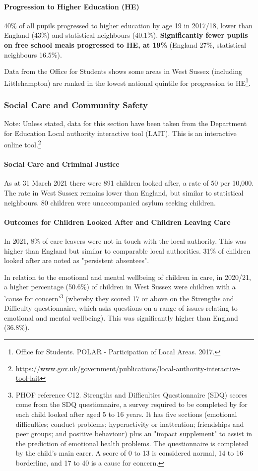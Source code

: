 \paragraph{Progression to Higher Education (HE)} 40\% of all pupils progressed to higher education by age 19 in 2017/18, lower than England (43\%) and statistical neighbours (40.1\%). {\bfseries Significantly fewer pupils on free school meals progressed to HE, at 19\%} (England 27\%, statistical neighbours 16.5\%).

Data from the Office for Students shows some areas in West Sussex (including Littlehampton) are ranked in the lowest national quintile for progression to HE\footnote{Office for Students. POLAR - Participation of Local Areas. 2017.}.

\subsubsection{Social Care and Community Safety}
Note: Unless stated, data for this section have been taken from the Department for Education Local authority interactive tool (LAIT). This is an interactive online tool.\footnote{\url{https://www.gov.uk/government/publications/local-authority-interactive-tool-lait}}
\paragraph{Social Care and Criminal Justice}

As at 31 March 2021 there were 891 children looked after, a rate of 50 per 10,000. The rate in West Sussex remains lower than England, but similar to statistical neighbours. 80 children were unaccompanied asylum seeking children.

\paragraph{Outcomes for Children Looked After and Children Leaving Care}
In 2021, 8\% of care leavers were not in touch with the local authority. This was higher than England but similar to comparable local authorities. 31\% of children looked after are noted as "persistent absentees".

In relation to the emotional and mental wellbeing of children in care, in 2020/21, a higher percentage (50.6\%) of children in West Sussex were children with a 'cause for concern'\footnote{PHOF reference C12. Strengths and Difficulties Questionnaire (SDQ) scores come from the SDQ questionnaire, a survey required to be completed by for each child looked after aged 5 to 16 years. It has five sections (emotional difficulties; conduct problems; hyperactivity or inattention; friendships and peer groups; and positive behaviour) plus an "impact supplement" to assist in the prediction of emotional health problems. The questionnaire is completed by the child's main carer. A score of 0 to 13 is considered normal, 14 to 16 borderline, and 17 to 40 is a cause for concern.} (whereby they scored 17 or above on the Strengths and Difficulty questionnaire, which asks questions on a range of issues relating to emotional and mental wellbeing). This was significantly higher than England (36.8\%).

